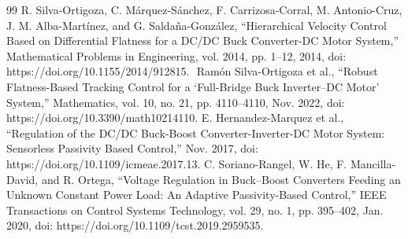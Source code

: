 \documentclass[12pt,oneside,openany]{book}
\begin{document}
\begin{thebibliography}{99}
R. Silva-Ortigoza, C. Márquez-Sánchez, F. Carrizosa-Corral, M. Antonio-Cruz, J. M. Alba-Martínez, and G. Saldaña-González, “Hierarchical Velocity Control Based on Differential Flatness for a DC/DC Buck Converter-DC Motor System,” Mathematical Problems in Engineering, vol. 2014, pp. 1–12, 2014, doi: https://doi.org/10.1155/2014/912815.
‌%
Ramón Silva-Ortigoza et al., “Robust Flatness-Based Tracking Control for a ‘Full-Bridge Buck Inverter–DC Motor’ System,” Mathematics, vol. 10, no. 21, pp. 4110–4110, Nov. 2022, doi: https://doi.org/10.3390/math10214110.
E. Hernandez-Marquez et al., “Regulation of the DC/DC Buck-Boost Converter-Inverter-DC Motor System: Sensorless Passivity Based Control,” Nov. 2017, doi: https://doi.org/10.1109/icmeae.2017.13.
‌C. Soriano-Rangel, W. He, F. Mancilla-David, and R. Ortega, “Voltage Regulation in Buck–Boost Converters Feeding an Unknown Constant Power Load: An Adaptive Passivity-Based Control,” IEEE Transactions on Control Systems Technology, vol. 29, no. 1, pp. 395–402, Jan. 2020, doi: https://doi.org/10.1109/tcst.2019.2959535.
‌%


\end{thebibliography}
\end{document}
